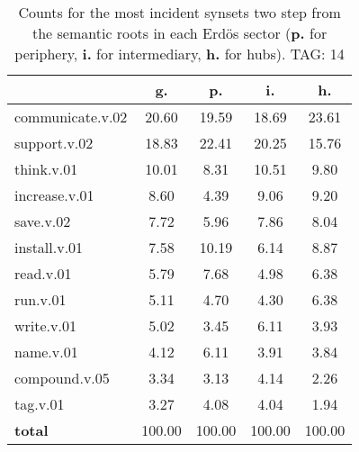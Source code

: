 \begin{table}[h!]
\begin{center}
\begin{tabular}{| l | c | c | c | c |}\hline
 & g. & p. & i. & h. \\\hline
communicate.v.02 & 20.60  & 19.59  & 18.69  & 23.61 \\\hline
support.v.02 & 18.83  & 22.41  & 20.25  & 15.76 \\\hline
think.v.01 & 10.01  & 8.31  & 10.51  & 9.80 \\\hline
increase.v.01 & 8.60  & 4.39  & 9.06  & 9.20 \\\hline
save.v.02 & 7.72  & 5.96  & 7.86  & 8.04 \\\hline
install.v.01 & 7.58  & 10.19  & 6.14  & 8.87 \\\hline
read.v.01 & 5.79  & 7.68  & 4.98  & 6.38 \\\hline
run.v.01 & 5.11  & 4.70  & 4.30  & 6.38 \\\hline
write.v.01 & 5.02  & 3.45  & 6.11  & 3.93 \\\hline
name.v.01 & 4.12  & 6.11  & 3.91  & 3.84 \\\hline
compound.v.05 & 3.34  & 3.13  & 4.14  & 2.26 \\\hline
tag.v.01 & 3.27  & 4.08  & 4.04  & 1.94 \\\hline
{{\bf total}} & 100.00  & 100.00  & 100.00  & 100.00 \\\hline
\end{tabular}
\caption{Counts for the most incident synsets two step from the semantic roots in each Erd\"os sector ({\bf p.} for periphery, {\bf i.} for intermediary, {\bf h.} for hubs). TAG: 14}
\end{center}
\end{table}